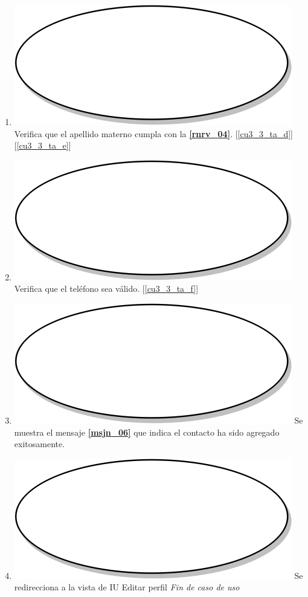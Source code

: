\begin{enumerate}
  \item {\includegraphics[scale=.05]{Capitulo3/img/proceso.png} Verifica que el apellido materno cumpla con la \textbf{\ref{rnrv_04}}. [\ref{cu3_3_ta_d}] [\ref{cu3_3_ta_e}]}
  \item {\includegraphics[scale=.05]{Capitulo3/img/proceso.png} Verifica que el teléfono sea válido. [\ref{cu3_3_ta_f}]}
  \item {\includegraphics[scale=.05]{Capitulo3/img/proceso.png} Se muestra el mensaje \textbf{\ref{msjn_06}} que indica el contacto ha sido agregado exitosamente.}
\item {\includegraphics[scale=.05]{Capitulo3/img/proceso.png} Se redirecciona a la vista de IU Editar perfil}
  \textit{Fin de caso de uso} \\  
\end{enumerate}

